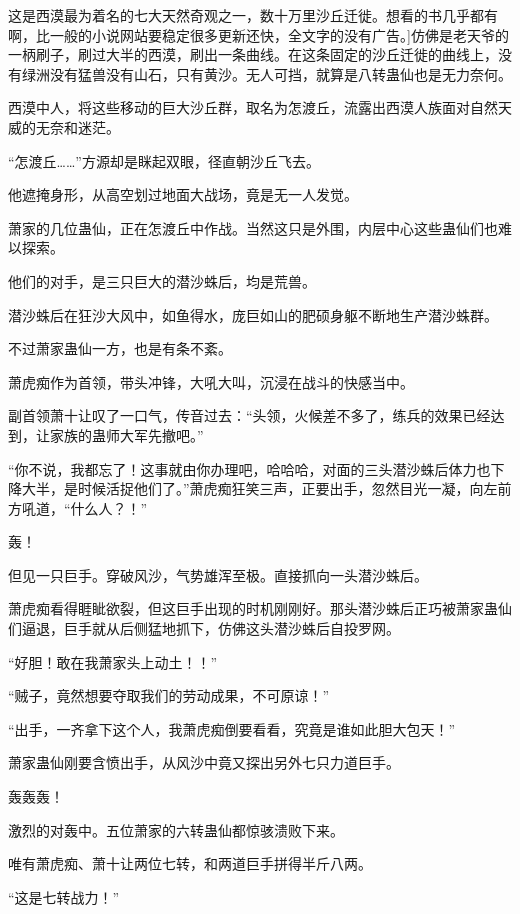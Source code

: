 
\begin{this_body}

这是西漠最为着名的七大天然奇观之一，数十万里沙丘迁徙。想看的书几乎都有啊，比一般的小说网站要稳定很多更新还快，全文字的没有广告。]仿佛是老天爷的一柄刷子，刷过大半的西漠，刷出一条曲线。在这条固定的沙丘迁徙的曲线上，没有绿洲没有猛兽没有山石，只有黄沙。无人可挡，就算是八转蛊仙也是无力奈何。

西漠中人，将这些移动的巨大沙丘群，取名为怎渡丘，流露出西漠人族面对自然天威的无奈和迷茫。

“怎渡丘……”方源却是眯起双眼，径直朝沙丘飞去。

他遮掩身形，从高空划过地面大战场，竟是无一人发觉。

萧家的几位蛊仙，正在怎渡丘中作战。当然这只是外围，内层中心这些蛊仙们也难以探索。

他们的对手，是三只巨大的潜沙蛛后，均是荒兽。

潜沙蛛后在狂沙大风中，如鱼得水，庞巨如山的肥硕身躯不断地生产潜沙蛛群。

不过萧家蛊仙一方，也是有条不紊。

萧虎痴作为首领，带头冲锋，大吼大叫，沉浸在战斗的快感当中。

副首领萧十让叹了一口气，传音过去：“头领，火候差不多了，练兵的效果已经达到，让家族的蛊师大军先撤吧。”

“你不说，我都忘了！这事就由你办理吧，哈哈哈，对面的三头潜沙蛛后体力也下降大半，是时候活捉他们了。”萧虎痴狂笑三声，正要出手，忽然目光一凝，向左前方吼道，“什么人？！”

轰！

但见一只巨手。穿破风沙，气势雄浑至极。直接抓向一头潜沙蛛后。

萧虎痴看得睚眦欲裂，但这巨手出现的时机刚刚好。那头潜沙蛛后正巧被萧家蛊仙们逼退，巨手就从后侧猛地抓下，仿佛这头潜沙蛛后自投罗网。

“好胆！敢在我萧家头上动土！！”

“贼子，竟然想要夺取我们的劳动成果，不可原谅！”

“出手，一齐拿下这个人，我萧虎痴倒要看看，究竟是谁如此胆大包天！”

萧家蛊仙刚要含愤出手，从风沙中竟又探出另外七只力道巨手。

轰轰轰！

激烈的对轰中。五位萧家的六转蛊仙都惊骇溃败下来。

唯有萧虎痴、萧十让两位七转，和两道巨手拼得半斤八两。

“这是七转战力！”


\end{this_body}
